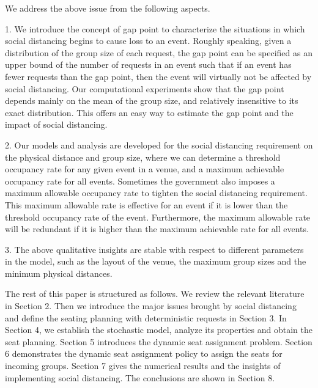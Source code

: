We address the above issue from the following aspects.

1. We introduce the concept of gap point to characterize the situations in which social distancing begins to cause loss to an event. Roughly speaking, given a distribution of the group size of each request, the gap point can be specified as an upper bound of the number of requests in an event such that if an event has fewer requests than the gap point, then the event will virtually not be affected by social distancing. Our computational experiments show that the gap point depends mainly on the mean of the group size, and relatively insensitive to its exact distribution. This offers an easy way to estimate the gap point and  the impact of social distancing.


2. Our models and analysis are developed for the social distancing requirement on the physical distance and group size, where we can determine a threshold occupancy rate for any given event in a venue, and a maximum achievable occupancy rate for all events. Sometimes the government also imposes a maximum allowable occupancy rate to tighten the social distancing requirement. This maximum allowable rate is effective for an event if it is lower than the threshold occupancy rate of the event. Furthermore, the maximum allowable rate will be redundant if it is higher than the maximum achievable rate for all events.

3. The above qualitative insights are stable with respect to different parameters in the model, such as the layout of the venue, the maximum group sizes and the minimum physical distances. 

The rest of this paper is structured as follows. We review the relevant literature in Section 2. Then we introduce the major issues brought by social distancing and define the seating planning with deterministic requests in Section 3. In Section 4, we establish the stochastic model, analyze its properties and obtain the seat planning. Section 5 introduces the dynamic seat assignment problem.
Section 6 demonstrates the dynamic seat assignment policy to assign the seats for incoming groups. Section 7 gives the numerical results and the insights of implementing social distancing. The conclusions are shown in Section 8.
\newpage
